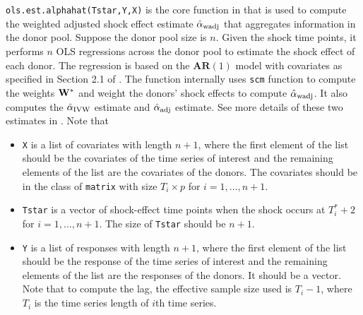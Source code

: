 \documentclass[12pt]{article}
\begin{document}
 \texttt{ols.est.alphahat(Tstar,Y,X)} is the core function in  that is used to compute the weighted adjusted shock effect estimate $\hat{\alpha}_{\rm wadj}$ that aggregates information in the donor pool. Suppose the donor pool size is $n$. Given the shock time points, it performs $n$ OLS regressions across the donor pool to estimate the shock effect of each donor. The regression is based on the $\textbf{AR}(1)$ model with covariates as specified in Section 2.1 of .  The function internally uses \texttt{scm} function to compute the weights $\mathbf{W}^*$ and weight the donors' shock effects to compute $\hat{\alpha}_{\rm wadj}$. It also computes the $\hat{\alpha}_{\rm IVW}$ estimate and $\hat{\alpha}_{\rm adj}$ estimate. See more details of these two estimates in . Note that
\begin{itemize}
	\item \texttt{X} is a list of covariates with length $n+1$, where the first element of the list should be the covariates of the time series of interest and the remaining elements of the list are the covariates of the donors. The covariates should be in the class of \texttt{matrix} with size $T_i\times p$ for $i = 1, \ldots, n+1$.
	\item \texttt{Tstar} is a vector of shock-effect time points when the shock occurs at $T^*_i+2$ for $i = 1, \ldots, n+1$. The size of \texttt{Tstar} should be $n+1$. 
	\item \texttt{Y} is a list of responses with length $n +1$,  where the first element of the list should be the response of the time series of interest and the remaining elements of the list are the responses of the donors. It should be a vector.  Note  that to compute the lag, the effective sample size used is $T_i - 1$, where $T_i$ is the time series length of $i$th time series.
\end{itemize}
 
\end{document}

